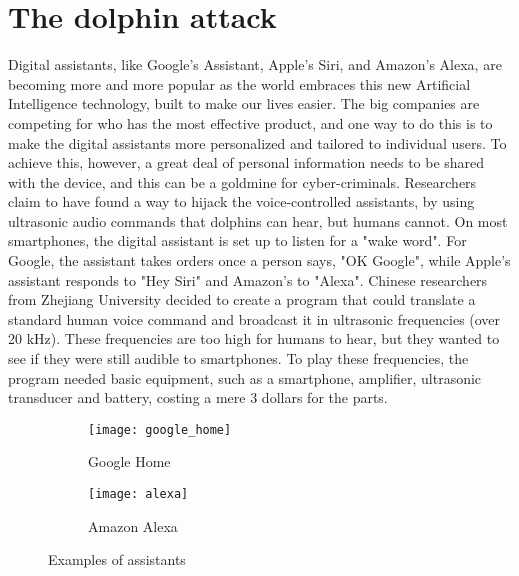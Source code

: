 \documentclass[12pt]{report}
\begin{document}
\section{The dolphin attack}
Digital assistants, like Google's Assistant, Apple's Siri, and Amazon's Alexa, are becoming more and more popular as the world embraces this new Artificial Intelligence technology, built to make our lives easier. The big companies are competing for who has the most effective product, and one way to do this is to make the digital assistants more personalized and tailored to individual users. To achieve this, however, a great deal of personal information needs to be shared with the device, and this can be a goldmine for cyber-criminals.
Researchers claim to have found a way to hijack the voice-controlled assistants, by using ultrasonic audio commands that dolphins can hear, but humans cannot. On most smartphones, the digital assistant is set up to listen for a "wake word". For Google, the assistant takes orders once a person says, "OK Google", while Apple's assistant responds to "Hey Siri" and Amazon's to "Alexa".
Chinese researchers from Zhejiang University decided to create a program that could translate a standard human voice command and broadcast it in ultrasonic frequencies (over 20 kHz). These frequencies are too high for humans to hear, but they wanted to see if they were still audible to smartphones. To play these frequencies, the program needed basic equipment, such as a smartphone, amplifier, ultrasonic transducer and battery, costing a mere 3 dollars for the parts.

\begin{figure}[h!]
  \centering
  \begin{subfigure}[b]{0.4\linewidth}
    \texttt{[image: google\_home]}
    \caption{Google Home}
    \label{fig:g_home}
  \end{subfigure}
  \begin{subfigure}[b]{0.4\linewidth}
    \texttt{[image: alexa]}
    \caption{Amazon Alexa}
    \label{fig:alexa}
  \end{subfigure}
  \caption{Examples of assistants}
  \label{fig:assistants}
\end{figure}


\listoffigures
 
\listoftables
\end{document}
